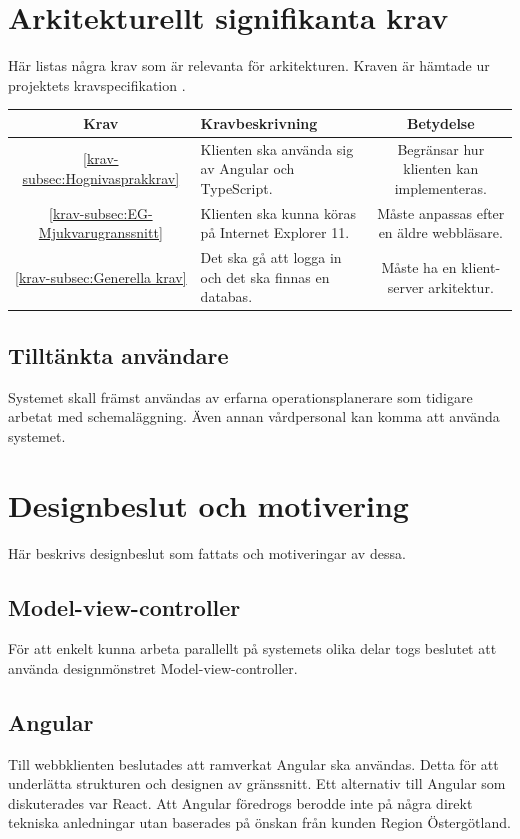 \documentclass[a4paper,10pt]{article}
\begin{document}
\section{Arkitekturellt signifikanta krav}
Här listas några krav som är relevanta för arkitekturen. Kraven är hämtade ur projektets kravspecifikation \cite{kravspec}.

\begin{tabular}{|c|p{6cm}|c|}
  \hline
  Krav & Kravbeskrivning & Betydelse \\
  \hline
  \ref{krav-subsec:Hognivasprakkrav} & Klienten ska använda sig av Angular och TypeScript. & Begränsar hur klienten kan implementeras.
  \\
  \hline
  \ref{krav-subsec:EG-Mjukvarugranssnitt} & Klienten ska kunna köras på Internet Explorer 11. & Måste anpassas efter en äldre webbläsare.
  \\
  \hline
  \ref{krav-subsec:Generella krav} & Det ska gå att logga in och det ska \hyphenation{finnas}finnas en databas. & Måste ha en klient-server arkitektur.
  \\
  \hline
\end{tabular}

\subsection{Tilltänkta användare}
Systemet skall främst användas av erfarna operationsplanerare som tidigare arbetat med schemaläggning. Även annan vårdpersonal kan komma att använda systemet.

\section{Designbeslut och motivering}
Här beskrivs designbeslut som fattats och motiveringar av dessa.

\subsection{Model-view-controller}
För att enkelt kunna arbeta parallellt på systemets olika delar togs beslutet att använda designmönstret Model-view-controller.

\subsection{Angular}
Till webbklienten beslutades att ramverkat Angular ska användas. Detta för att underlätta strukturen och designen av gränssnitt.
Ett alternativ till Angular som diskuterades var React. Att Angular föredrogs berodde inte på några direkt tekniska anledningar utan baserades på önskan från kunden Region Östergötland.
\end{document}
